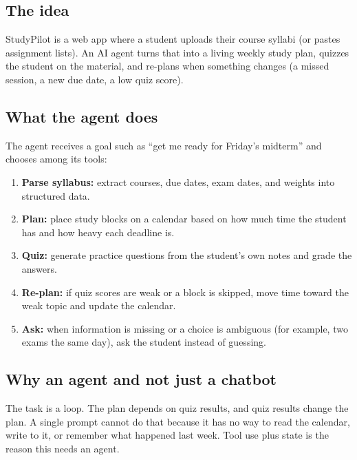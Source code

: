 \documentclass[11pt]{article}
\begin{document}
\subsection{The idea}
StudyPilot is a web app where a student uploads their course syllabi (or pastes
assignment lists). An AI agent turns that into a living weekly study plan, quizzes
the student on the material, and re-plans when something changes (a missed session,
a new due date, a low quiz score).

\subsection{What the agent does}
The agent receives a goal such as ``get me ready for Friday's midterm'' and chooses
among its tools:
\begin{enumerate}
  \item \textbf{Parse syllabus:} extract courses, due dates, exam dates, and weights
        into structured data.
  \item \textbf{Plan:} place study blocks on a calendar based on how much time the
        student has and how heavy each deadline is.
  \item \textbf{Quiz:} generate practice questions from the student's own notes and
        grade the answers.
  \item \textbf{Re-plan:} if quiz scores are weak or a block is skipped, move time
        toward the weak topic and update the calendar.
  \item \textbf{Ask:} when information is missing or a choice is ambiguous (for
        example, two exams the same day), ask the student instead of guessing.
\end{enumerate}

\subsection{Why an agent and not just a chatbot}
The task is a loop. The plan depends on quiz results, and quiz results change the
plan. A single prompt cannot do that because it has no way to read the calendar,
write to it, or remember what happened last week. Tool use plus state is the
reason this needs an agent.
\end{document}
